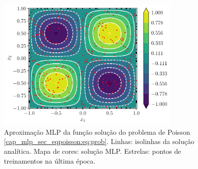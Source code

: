 \begin{figure}[H]
  \centering
  \includegraphics[width=0.8\textwidth]{cap_pinns/dados/py_pinn_poisson/fig}
  \caption{Aproximação MLP da função solução do problema de Poisson \eqref{cap_mlp_sec_eqpoisson:eq:prob}. Linhas: isolinhas da solução analítica. Mapa de cores: solução MLP. Estrelas: pontos de treinamentos na última época.}
  \label{fig:mlp_apfun_2d}
\end{figure}



